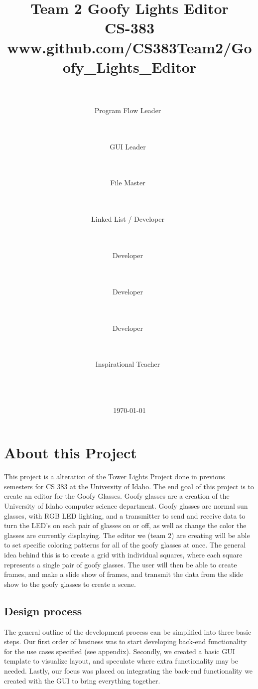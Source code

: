 \documentclass[11pt]{article} %
\title{
	{\Huge Team 2 Goofy Lights Editor}
	\\
	{\Large CS-383} \\
	{\small www.github.com/CS383Team2/Goofy\_Lights\_Editor}}
\author{
	\\
	\makebox[.3\linewidth]{Nick Krenowicz}\\Program Flow Leader\ \and
	\\
	\makebox[.3\linewidth]{Paul Martin}\\GUI Leader\ \and
	\\
	\makebox[.3\linewidth]{Tim Sonnen}\\File Master\ \and
	\\
	\makebox[.3\linewidth]{Kevin Dorscher}\\Linked List / Developer\ \and
	\\
	\makebox[.3\linewidth]{Joe Carter}\\Developer\ \and
	\\
	\makebox[.3\linewidth]{Lise Welch}\\Developer\ \and
	\\
	\makebox[.3\linewidth]{Emma Bateman}\\Developer\ \and
	\\
	\makebox[.3\linewidth]{Bruce Bolden}\\Inspirational Teacher\ %
	\\
	\\
	\\
	\\}
\date{\today} %
\begin{document}
\lstset{language=C++}
\maketitle
\pagebreak

\tableofcontents
\newpage %


\section{About this Project}
This project is a alteration of the Tower Lights Project done in previous semesters for CS 383 at the University of Idaho. The end goal of this project is to create an editor for the Goofy Glasses. Goofy glasses are a creation of the University of Idaho computer science department. Goofy glasses are normal sun glasses, with RGB LED lighting, and a transmitter to send and receive data to turn the LED's on each pair of glasses on or off, as well as change the color the glasses are currently displaying. The editor we (team 2) are creating will be able to set specific coloring patterns for all of the goofy glasses at once. The general idea behind this is to create a grid with individual squares, where each square represents a single pair of goofy glasses. The user will then be able to create frames, and make a slide show of frames, and transmit the data from the slide show to the goofy glasses to create a scene. 

\subsection{Design process}
The general outline of the development process can be simplified into three basic steps. Our first order of business was to start developing back-end functionality for the use cases specified (see appendix). Secondly, we created a basic GUI template to visualize layout, and speculate where extra functionality may be needed. Lastly, our focus was placed on integrating the back-end functionality we created with the GUI to bring everything together.
\end{document}
